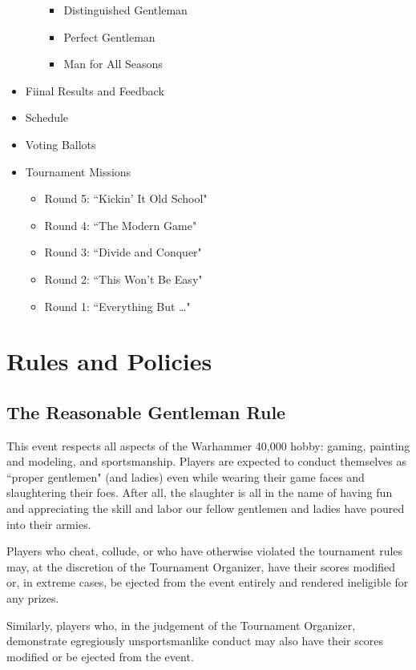 \documentclass[12pt,titlepage]{article}
\begin{document}
\begin{itemize}
\begin{itemize}
\begin{itemize}
    \item Distinguished Gentleman
    \item Perfect Gentleman
    \item Man for All Seasons
    \end{itemize}
  \end{itemize}
\item Fiinal Results and Feedback
\item Schedule
\item Voting Ballots
\item Tournament Missions
  \begin{itemize}
  \item Round 5: ``Kickin' It Old School"
  \item Round 4: ``The Modern Game"
  \item Round 3: ``Divide and Conquer"
  \item Round 2: ``This Won't Be Easy"
  \item Round 1: ``Everything But \ldots"
  \end{itemize}
\end{itemize}

\newpage

\section*{Rules and Policies}

\subsection*{The Reasonable Gentleman Rule}

This event respects all aspects of the Warhammer 40,000 hobby: gaming, painting and modeling, and sportsmanship. Players are expected to conduct themselves as ``proper gentlemen" (and ladies) even while wearing their game faces and slaughtering their foes. After all, the slaughter is all in the name of having fun and appreciating the skill and labor our fellow gentlemen and ladies have poured into their armies.

Players who cheat, collude, or who have otherwise violated the tournament rules may, at the discretion of the Tournament Organizer, have their scores modified or, in extreme cases, be ejected from the event entirely and rendered ineligible for any prizes.

Similarly, players who, in the judgement of the Tournament Organizer, demonstrate egregiously unsportsmanlike conduct may also have their scores modified or be ejected from the event.
\end{document}
